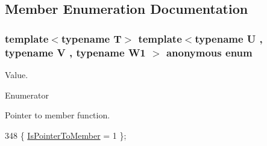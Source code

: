 \subsection{Member Enumeration Documentation}
\subsubsection[{\texorpdfstring{anonymous enum}{anonymous enum}}]{\setlength{\rightskip}{0pt plus 5cm}template$<$typename T$>$ template$<$typename U , typename V , typename W1 $>$ anonymous enum}\hypertarget{structTypeTraits_1_1PtrToMemberTraits_3_01U_07V_1_1_5_08_07W1_08_01const_01_01_4_aa3332f934f2ded410d9991ad51a3d49a}{}\label{structTypeTraits_1_1PtrToMemberTraits_3_01U_07V_1_1_5_08_07W1_08_01const_01_01_4_aa3332f934f2ded410d9991ad51a3d49a}
Value. \begin{Desc}
\item[Enumerator]\par
\begin{description}
\item[{\em 
Is\+Pointer\+To\+Member\hypertarget{structTypeTraits_1_1PtrToMemberTraits_3_01U_07V_1_1_5_08_07W1_08_01const_01_01_4_aa3332f934f2ded410d9991ad51a3d49aa49aab7ee7206b7fe38d98b2e4810279d}{}\label{structTypeTraits_1_1PtrToMemberTraits_3_01U_07V_1_1_5_08_07W1_08_01const_01_01_4_aa3332f934f2ded410d9991ad51a3d49aa49aab7ee7206b7fe38d98b2e4810279d}
}]Pointer to member function. \end{description}
\end{Desc}

\begin{DoxyCode}
348 \{ \hyperlink{structTypeTraits_1_1PtrToMemberTraits_3_01U_07V_1_1_5_08_07W1_08_01const_01_01_4_aa3332f934f2ded410d9991ad51a3d49aa49aab7ee7206b7fe38d98b2e4810279d}{IsPointerToMember} = 1    \};
\end{DoxyCode}
